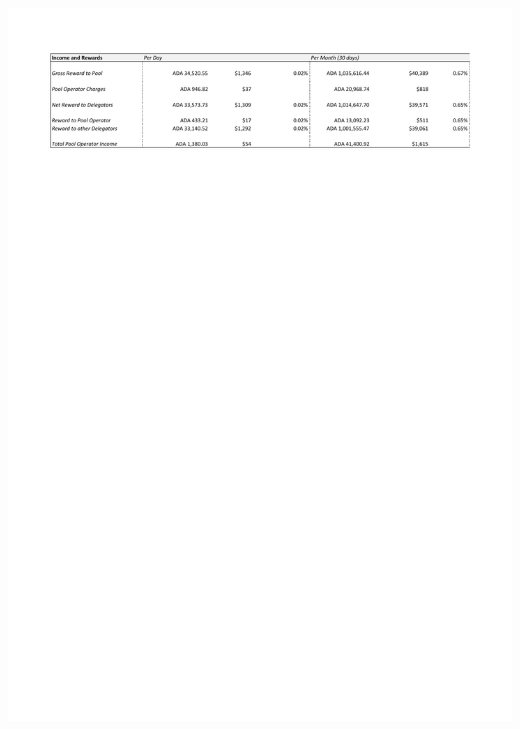 \documentclass[11pt,a4paper,dvipsnames,twosided,final]{article}
\begin{document}
\hspace{-0.65in}\begin{minipage}{\textwidth}
  \includegraphics[width=1.2\textwidth]{RC3.pdf}

\end{minipage}
\end{document}
